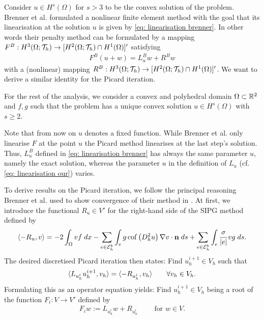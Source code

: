 Consider $u\in H^s(\Omega)$ for $s>3$ to be the convex solution of the \MA problem. Brenner et al. formulated a nonlinear finite element method with the goal that its linearisation at the solution $u$ is given by \eqref{eq: linearisation brenner}. In other words their penalty method can be formulated by a mapping $F^B:H^3(\Omega; \mathcal{T}_h) \rightarrow [H^2(\Omega; \mathcal{T}_h) \cap H^1(\Omega)]'$ satisfying
 \begin{align}
 	F^B(u +w ) = L^B_u w + R^Bw \label{eq: add brenner method}
 \end{align}
 with a (nonlinear) mapping $R^B:H^3(\Omega; \mathcal{T}_h) \rightarrow [H^2(\Omega; \mathcal{T}_h) \cap H^1(\Omega)]'$. 
% 
We want to derive a similar identity for the Picard iteration. 

For the rest of the analysis, we consider a convex and polyhedral domain $\Omega\subset \mathbb{R}^2$ and $f,g$ such that the \MA problem has a unique convex solution $u \in H^s(\Omega)$ with $s\geq 2$. 

Note that from now on $u$ denotes a fixed function. While Brenner et al. only linearise $F$ at the point $u$ the Picard method linearises at the last step's solution. Thus, $L_u^B$ defined in \eqref{eq: linearisation brenner} has always the same parameter $u$, namely the exact solution, whereas the parameter $u$ in the definition of $L_u$ (cf. \eqref{eq: linearisation our}) varies. 

To derive results on the Picard iteration, we follow the principal reasoning Brenner et al. used to show convergence of their method in \cite{BGN+2011}. At first, we introduce the functional $R_u \in V'$ for the right-hand side of the SIPG method defined by
\begin{align}
 \langle -R_u, v \rangle = - 2 \int_{\Omega} {{v f}\;dx}
-\sum\limits_{e \in \mathcal{E}_h^b}\int_{e} {{ g \operatorname{cof} \left( D_h^2 u \right) \nabla v \cdot \mathbf n }\;ds}
+\sum\limits_{e \in \mathcal{E}_h^b} \int_{e} {{ \frac \sigma {|e|} v g}\;ds}. \label{eq: definition R}
\end{align}
The desired discretised Picard iteration then states: Find $u^{i+1}_h \in V_h$ such that
\begin{align}
 \langle L_{u^i_h} u^{i+1}_h, v_h \rangle =   \langle -R_{u^i_h}, v_h \rangle   \qquad \forall v_h \in V_h. \label{eq: fixed point functional}
\end{align}
Formulating this as an operator equation yields: Find $u_h^{i+1} \in V_h$ being a root of the function $F_i:V \rightarrow V'$ defined by
\begin{align}
 {F_iw} :=  L_{u^i_h} w + R_{u^i_h}  \qquad \text{ for } w \in V. \label{eq: definition F}
\end{align}



